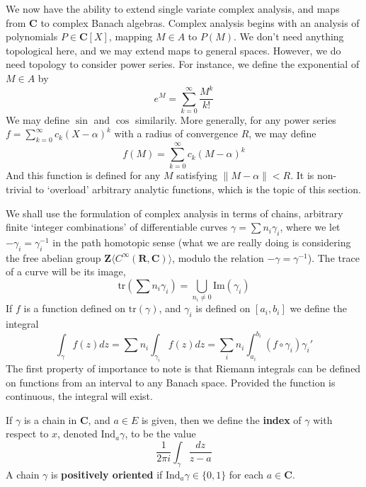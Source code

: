 We now have the ability to extend single variate complex analysis, and maps from $\mathbf{C}$ to complex Banach algebras. Complex analysis begins with an analysis of polynomials $P \in \mathbf{C}[X]$, mapping $M \in A$ to $P(M)$. We don't need anything topological here, and we may extend maps to general spaces. However, we do need topology to consider power series. For instance, we define the exponential of $M \in A$ by
%
\[ e^M = \sum_{k = 0}^\infty \frac{M^k}{k!} \]
%
We may define $\sin$ and $\cos$ similarily. More generally, for any power series $f = \sum_{k = 0}^\infty c_k (X - \alpha)^k$ with a radius of convergence $R$, we may define
%
\[ f(M) = \sum_{k = 0}^\infty c_k (M - \alpha)^k \]
%
And this function is defined for any $M$ satisfying $\|M - \alpha \| < R$. It is non-trivial to `overload' arbitrary analytic functions, which is the topic of this section.

We shall use the formulation of complex analysis in terms of chains, arbitrary finite `integer combinations' of differentiable curves $\gamma = \sum n_i \gamma_i$, where we let $- \gamma_i = \gamma_i^{-1}$ in the path homotopic sense (what we are really doing is considering the free abelian group $\mathbf{Z}\langle C^\infty(\mathbf{R}, \mathbf{C}) \rangle$, modulo the relation $- \gamma = \gamma^{-1}$). The trace of a curve will be its image,
%
\[ \text{tr}(\sum n_i \gamma_i) = \bigcup_{n_i \neq 0} \text{Im}(\gamma_i) \]
%
If $f$ is a function defined on $\text{tr}(\gamma)$, and $\gamma_i$ is defined on $[a_i, b_i]$ we define the integral
%
\[ \int_\gamma f(z) dz = \sum n_i \int_{\gamma_i} f(z) dz = \sum_i n_i \int_{a_i}^{b_i} (f \circ \gamma_i) \gamma_i' \]
%
The first property of importance to note is that Riemann integrals can be defined on functions from an interval to any Banach space. Provided the function is continuous, the integral will exist.

If $\gamma$ is a chain in $\mathbf{C}$, and $a \in E$ is given, then we define the {\bf index} of $\gamma$ with respect to $x$, denoted $\text{Ind}_a \gamma$, to be the value
%
\[ \frac{1}{2 \pi i} \int_\gamma \frac{dz}{z - a} \]
%
A chain $\gamma$ is {\bf positively oriented} if $\text{Ind}_a \gamma \in \{ 0, 1 \}$ for each $a \in \mathbf{C}$.

